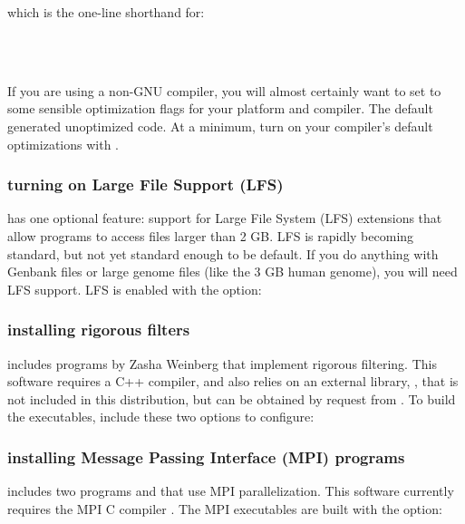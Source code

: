 which is the one-line shorthand for:

\\
\\

If you are using a non-GNU compiler, you will almost certainly want to
set  to some sensible optimization flags for your
platform and compiler. The  default generated unoptimized
code. At a minimum, turn on your compiler's default optimizations with
.

\subsubsection{turning on Large File Support (LFS)}

 has one optional feature: support for Large File
System (LFS) extensions that allow programs to access files larger
than 2 GB. LFS is rapidly becoming standard, but not yet standard
enough to be default. If you do anything with Genbank files or large
genome files (like the 3 GB human genome), you will need LFS support.
LFS is enabled with the  option:


\subsubsection{installing rigorous filters}

 includes programs by Zasha Weinberg that implement
rigorous filtering.  This software requires a C++ compiler, and also
relies on an external library, , that is not included
in this distribution, but can be obtained by request from
.
To build the executables, include these two options to configure:


\subsubsection{installing Message Passing Interface (MPI) programs}

 includes two programs  and
 that use MPI parallelization. This software
currently requires the MPI C compiler .  The MPI
executables are built with the  option:

